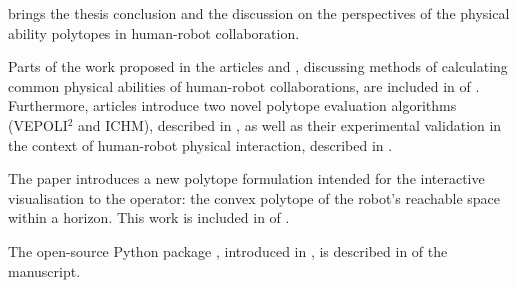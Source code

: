 
 brings the thesis conclusion and the discussion on the perspectives of the physical ability polytopes in human-robot collaboration.


{

\newrefcontext[labelprefix=A]
\printbibliography[keyword={phd}, title=List of publications, heading=subbibnumbered, prenote=pubthesis]

Parts of the work proposed in the articles \cite{skuric2021robot} and  \cite{skuric2021common}, discussing methods of calculating common physical abilities of human-robot collaborations, are included in  of . Furthermore, articles \cite{skuric2021robot,Skuric2022human,skuric2023dynamics} introduce two novel polytope evaluation algorithms (VEPOLI$^2$ and ICHM), described in , as well as their experimental validation in the context of human-robot physical interaction, described in . 


The paper \cite{Skuric2022hfr} introduces a new polytope formulation intended for the interactive visualisation to the operator: the convex polytope of the robot's reachable space within a horizon. This work is included in  of .


The open-source Python package , introduced in \cite{pycapacity}, is described in  of the manuscript.



}
{
\nocite{Zhen2020RWM, Skuric2022simplefoc}
\newrefcontext[labelprefix=B]
\printbibliography[keyword={phd_out}, title=Other publications during the thesis, heading=subbibliography, prenote=nopubthesis]



}

